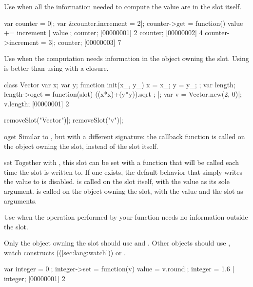 \begin{urbiscriptapi}
  Use  when all the information needed to compute the value are
  in the slot itself.

\begin{urbiscript}
var counter = 0|;
var &counter.increment = 2|;
counter->get = function()
{ value += increment | value}|;
counter;
[00000001] 2
counter;
[00000002] 4
counter->increment = 3|;
counter;
[00000003] 7
\end{urbiscript}

Use  when the computation needs information in the object
owning the slot. Using  is better than using  with
a closure.

\begin{urbiscript}
class Vector
{
  var x;
  var y;
  function init(x_, y_)
  {
    x = x_;
    y = y_;
  };
  var length;
  length->oget = function(slot)
  {
    ((x*x)+(y*y)).sqrt
  };
}|;
var v = Vector.new(2, 0)|;
v.length;
[00000001] 2
\end{urbiscript}

\begin{urbicomment}
removeSlot("Vector")|;
removeSlot("v")|;
\end{urbicomment}

\item[oget]%
  Similar to , but with a different signature: the callback
  function is called on the object owning the slot, instead of the slot
  itself.

\item[set]%
  Together with , this slot can be set with a function that will
  be called each time the
  slot is written to. If one exists, the default behavior that simply writes
  the value to  is disabled.
   is called on the slot itself, with the value as its sole
  argument.  is called on the object owning the slot, with
  the value and the slot as arguments.

  Use  when the operation performed by your function needs no
  information outside the slot.

  Only the object owning the slot should use  and .
  Other objects should use , watch constructs
  ((\autoref{sec:lang:watch})) or .

\begin{urbiscript}
var integer = 0|;
integer->set = function(v) { value = v.round}|;
integer = 1.6 | integer;
[00000001] 2
\end{urbiscript}


\end{urbiscriptapi}
